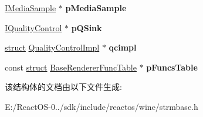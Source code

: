 \begin{DoxyCompactItemize}
\hyperlink{interface_i_media_sample}{I\+Media\+Sample} $\ast$ {\bfseries p\+Media\+Sample}
\item 
\mbox{\label{struct_base_renderer_tag_a8faffc391dc8f77ec5ca613f391ce79e}} 
\hyperlink{interface_i_quality_control}{I\+Quality\+Control} $\ast$ {\bfseries p\+Q\+Sink}
\item 
\mbox{\label{struct_base_renderer_tag_a91bf6cf8610fe3007681bee1ca32c5af}} 
\hyperlink{interfacestruct}{struct} \hyperlink{struct_quality_control_impl}{Quality\+Control\+Impl} $\ast$ {\bfseries qcimpl}
\item 
\mbox{\label{struct_base_renderer_tag_ae94c237f07bdd3d64d837c5dda8683d4}} 
const \hyperlink{interfacestruct}{struct} \hyperlink{struct_base_renderer_func_table}{Base\+Renderer\+Func\+Table} $\ast$ {\bfseries p\+Funcs\+Table}
\end{DoxyCompactItemize}


该结构体的文档由以下文件生成\+:\begin{DoxyCompactItemize}
\item 
E\+:/\+React\+O\+S-\/0../sdk/include/reactos/wine/strmbase.\+h\end{DoxyCompactItemize}
